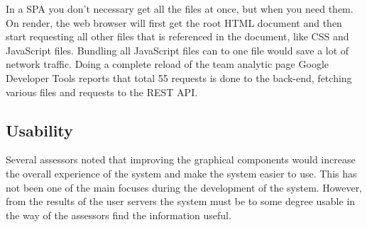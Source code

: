 In a \ac{SPA} you don't necessary get all the files at once, but when you need them. On render, the web browser will first get the root \ac{HTML} document and then start requesting all other files that is referenced in the document, like \ac{CSS} and JavaScript files. Bundling all JavaScript files can to one file would save a lot of network traffic. Doing a complete reload of the team analytic page Google Developer Tools reports that total 55 requests is done to the back-end, fetching various files and requests to the REST API.

\subsection{Usability}

Several assessors noted that improving the graphical components would increase the overall experience of the system and make the system easier to use. This has not been one of the main focuses during the development of the system. However, from the results of the user servers the system must be to some degree usable in the way of the assessors find the information useful. 







